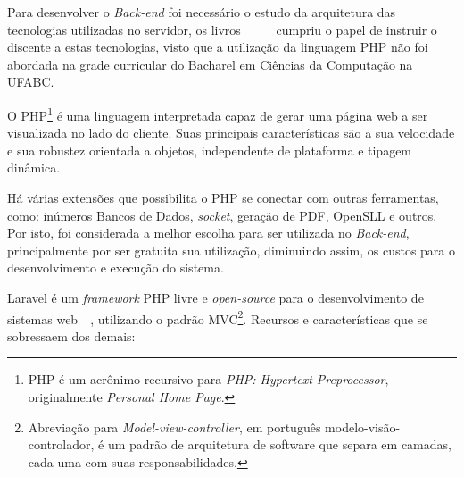 \documentclass[
  12pt,				%
  openany,
  oneside,
  a4paper,			%
  english,			%
  brazil
]{article}
\numberwithin{figure}{section}
\numberwithin{table}{section}
\newcounter{subsubsubsection}[subsubsection]
\begin{document}
Para desenvolver o \textit{Back-end} foi necessário o estudo da arquitetura das tecnologias utilizadas no servidor, os livros~\cite{PHP_Novatec_poo}~\cite{PHP_Novatec_dev}~\cite{PHP_Novatec_appWeb}~\cite{PHP_mysql}~\cite{PHP_Novatec_ajax} cumpriu o papel de instruir o discente a estas tecnologias, visto que a utilização da linguagem PHP não foi abordada na grade curricular do Bacharel em Ciências da Computação na UFABC.


O PHP\footnote{PHP é um acrônimo recursivo para \textit{PHP: Hypertext Preprocessor}, originalmente \textit{Personal Home Page}.} é uma linguagem interpretada capaz de gerar uma página web a ser visualizada no lado do cliente. Suas principais características são a sua velocidade e sua robustez orientada a objetos, independente de plataforma e tipagem dinâmica.

Há várias extensões que possibilita o PHP se conectar com outras ferramentas, como: inúmeros Bancos de Dados, \textit{socket}, geração de PDF, OpenSLL e outros. Por isto, foi considerada a melhor escolha para ser utilizada no \textit{Back-end}, principalmente por ser gratuita sua utilização, diminuindo assim, os custos para o desenvolvimento e execução do sistema.



Laravel é um \textit{framework} PHP livre e \textit{open-source} para o desenvolvimento de sistemas web~\cite{laravel5}~\cite{laravel_kiliccdaugi}, utilizando o padrão MVC\footnote{Abreviação para \textit{Model-view-controller}, em português modelo-visão-controlador, é um padrão de arquitetura de software que separa em camadas, cada uma com suas responsabilidades.}. Recursos e características que se sobressaem dos demais:
\end{document}
